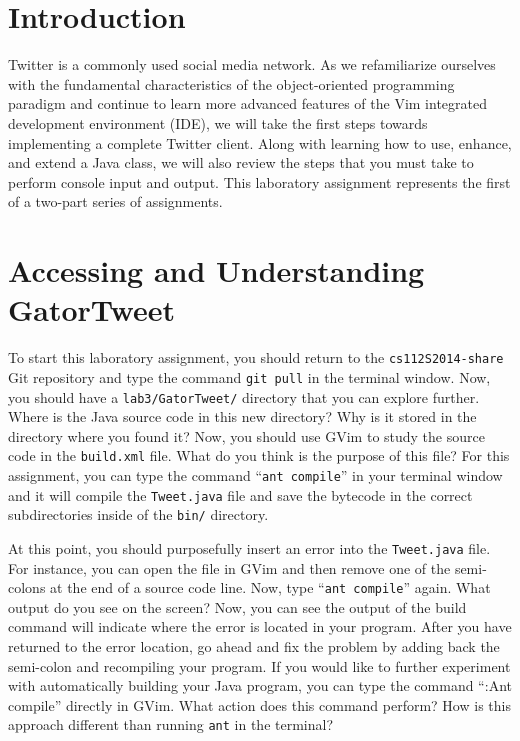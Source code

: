 


\usepackage[compact]{titlesec}


\section*{Introduction}

  Twitter is a commonly used social media network.  As we refamiliarize ourselves with the fundamental characteristics
  of the object-oriented programming paradigm and continue to learn more advanced features of the Vim integrated
  development environment (IDE), we will take the first steps towards implementing a complete Twitter client. Along with
  learning how to use, enhance, and extend a Java class, we will also review the steps that you must take to perform
  console input and output. This laboratory assignment represents the first of a two-part series of assignments. 

\section*{Accessing and Understanding GatorTweet}

  To start this laboratory assignment, you should return to the {\tt cs112S2014-share} Git repository and type the
  command {\tt git pull} in the terminal window.  Now, you should have a {\tt lab3/GatorTweet/} directory that you can
  explore further.  Where is the Java source code in this new directory? Why is it stored in the directory where you
  found it? Now, you should use GVim to study the source code in the {\tt build.xml} file.  What do you think is the
  purpose of this file?  For this assignment, you can type the command ``{\tt ant compile}'' in your terminal window and
  it will compile the {\tt Tweet.java} file and save the bytecode in the correct subdirectories inside of the {\tt bin/}
  directory. 

  At this point, you should purposefully insert an error into the {\tt Tweet.java} file.  For instance, you can open the
  file in GVim and then remove one of the semi-colons at the end of a source code line. Now, type ``{\tt ant compile}''
  again.  What output do you see on the screen? Now, you can see the output of the build command will indicate where the
  error is located in your program. After you have returned to the error location, go ahead and fix the problem by
  adding back the semi-colon and recompiling your program. If you would like to further experiment with automatically
  building your Java program, you can type the command ``{:Ant compile}'' directly in GVim. What action does this
  command perform? How is this approach different than running {\tt ant} in the terminal?

